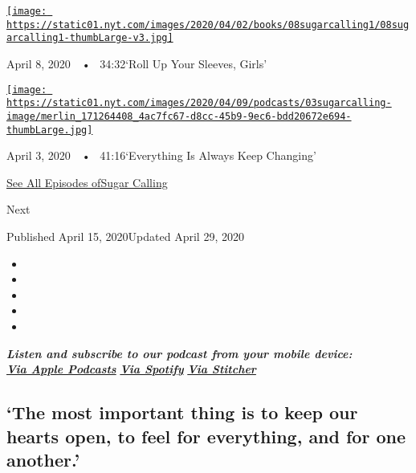 \href{https://www.nytimes.com/2020/04/08/podcasts/sugar-calling-margaret-atwood-coronavirus.html?action=click\&module=audio-series-bar\&region=header\&pgtype=Article}{\texttt{[image: https://static01.nyt.com/images/2020/04/02/books/08sugarcalling1/08sugarcalling1-thumbLarge-v3.jpg]}}

April 8, 2020~~•~ 34:32`Roll Up Your Sleeves, Girls'

\href{https://www.nytimes.com/2020/04/03/podcasts/sugar-calling-george-saunders-coronavirus.html?action=click\&module=audio-series-bar\&region=header\&pgtype=Article}{\texttt{[image: https://static01.nyt.com/images/2020/04/09/podcasts/03sugarcalling-image/merlin\_171264408\_4ac7fc67-d8cc-45b9-9ec6-bdd20672e694-thumbLarge.jpg]}}

April 3, 2020~~•~ 41:16`Everything Is Always Keep Changing'

\href{https://www.nytimes.com/column/sugar-calling}{See All Episodes
ofSugar Calling}

Next

Published April 15, 2020Updated April 29, 2020

\begin{itemize}
\item
\item
\item
\item
\item
\end{itemize}

\emph{\textbf{Listen and subscribe to our podcast from your mobile
device:}}\\
\textbf{\href{https://podcasts.apple.com/us/podcast/sugar-calling/id1505881384}{\emph{Via
Apple Podcasts}}} \emph{\textbf{\textbar{}}}
\textbf{\href{https://open.spotify.com/show/4U8hPiNGIBvTS9zLeiDCN7?si=gRyigD47SPWl-QWgNjgt2w}{\emph{Via
Spotify}}} \emph{\textbf{\textbar{}}}
\textbf{\href{https://www.stitcher.com/podcast/the-new-york-times/sugar-calling}{\emph{Via
Stitcher}}}

\hypertarget{the-most-important-thing-is-to-keep-our-hearts-open-to-feel-for-everything-and-for-one-another}{%
\subsection{`The most important thing is to keep our hearts open, to
feel for everything, and for one
another.'}\label{the-most-important-thing-is-to-keep-our-hearts-open-to-feel-for-everything-and-for-one-another}}

